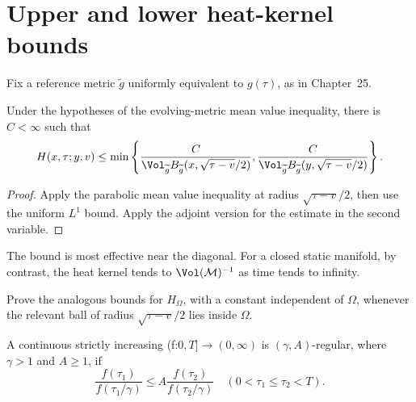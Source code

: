 \section{Upper and lower heat-kernel bounds}

Fix a reference metric \(\widetilde g\) uniformly equivalent to \(g(\tau)\),
as in Chapter~25.

\begin{lemma}
\label{lem:chow-iii-rough-evolving-heat-kernel-upper-bound}
Under the hypotheses of the evolving-metric mean value inequality, there is
\(C<\infty\) such that
\[
 H(x,\tau;y,v)\le\min\left\{
 \frac{C}{\Vol_{\widetilde g}B_{\widetilde g}(x,\sqrt{\tau-v}/2)},
 \frac{C}{\Vol_{\widetilde g}B_{\widetilde g}(y,\sqrt{\tau-v}/2)}
 \right\}.
\]
\end{lemma}
\begin{proof}
\sketch Apply the parabolic mean value inequality at radius \(\sqrt{\tau-v}/2\),
then use the uniform \(L^1\) bound.  Apply the adjoint version for the estimate
in the second variable.
\end{proof}

\begin{remark}
\label{rem:chow-iii-rough-upper-bound-interpretation}
The bound is most effective near the diagonal.  For a closed static manifold,
by contrast, the heat kernel tends to \(\Vol(\mathcal M)^{-1}\) as time tends
to infinity.
\end{remark}

\begin{claim}
\label{clm:chow-iii-rough-dirichlet-upper-bound-exercise}
Prove the analogous bounds for \(H_\Omega\), with a constant independent of
\(\Omega\), whenever the relevant ball of radius \(\sqrt{\tau-v}/2\) lies
inside \(\Omega\).
\end{claim}

\begin{definition}
\label{def:chow-iii-gamma-a-regular-function}
A continuous strictly increasing (f:\(0,T]\to(0,\infty)\) is
\((\gamma,A)\)-regular, where \(\gamma>1\) and \(A\ge1\), if
\[
 \frac{f(\tau_1)}{f(\tau_1/\gamma)}\le
 A\frac{f(\tau_2)}{f(\tau_2/\gamma)}
 \quad(0<\tau_1\le\tau_2<T).
\]
\end{definition}

